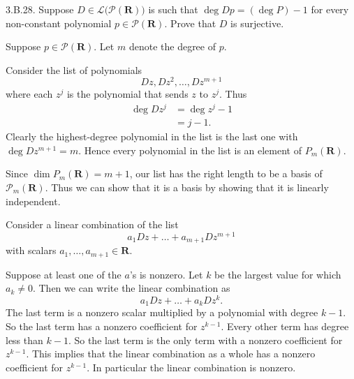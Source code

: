 \documentclass[a5paper]{article}
\begin{document}
\newcommand   \C           {\mathbf{C}}
\newcommand   \R           {\mathbf{R}}
\renewcommand \L           {\mathcal{L}}
\newcommand   \F           {\mathbf{F}}
\renewcommand \P           {\mathcal{P}}
\newcommand   \M           {\mathcal{M}}
\newcommand   \op          {\operatorname}

    3.B.28.
    Suppose $D \in \L\big(\P(\R)\big)$ is such that $\op{deg}Dp = (\op{deg}P) - 1$ for every non-constant polynomial $p \in \P(\R)$.
    Prove that $D$ is surjective.

    Suppose $p \in \P(\R)$.
    Let $m$ denote the degree of $p$.

    Consider the list of polynomials
\begin{equation*}
        Dz, Dz^2, \dots, Dz^{m+1}
\end{equation*}
    where each $z^j$ is the polynomial that sends $z$ to $z^j$.
    Thus
\begin{align*}
        \op{deg}Dz^j&=\op{deg}z^j - 1 \\
                    &=j-1 .
\end{align*}
    Clearly the highest-degree polynomial in the list is the last one with $\op{deg}Dz^{m+1} = m$.
    Hence every polynomial in the list is an element of $P_m(\R)$.

    Since $\op{dim}P_m(\R) = m+1$, our list has the right length to be a basis of $\P_m(\R)$.
    Thus we can show that it is a basis by showing that it is linearly independent.

    Consider a linear combination of the list
\begin{equation*}
        a_1Dz + \dots + a_{m+1}Dz^{m+1}
\end{equation*}
    with scalars $a_1,\dots,a_{m+1} \in \R$.

    Suppose at least one of the $a$'s is nonzero.
    Let $k$ be the largest value for which $a_k \neq 0$.
    Then we can write the linear combination as
\begin{equation*}
        a_1Dz + \dots + a_kDz^k .
\end{equation*}
    The last term is a nonzero scalar multiplied by a polynomial with degree $k-1$.
    So the last term has a nonzero coefficient for $z^{k-1}$.
    Every other term has degree less than $k-1$.
    So the last term is the only term with a nonzero coefficient for $z^{k-1}$.
    This implies that the linear combination as a whole has a nonzero coefficient for $z^{k-1}$.
    In particular the linear combination is nonzero.
\end{document}
